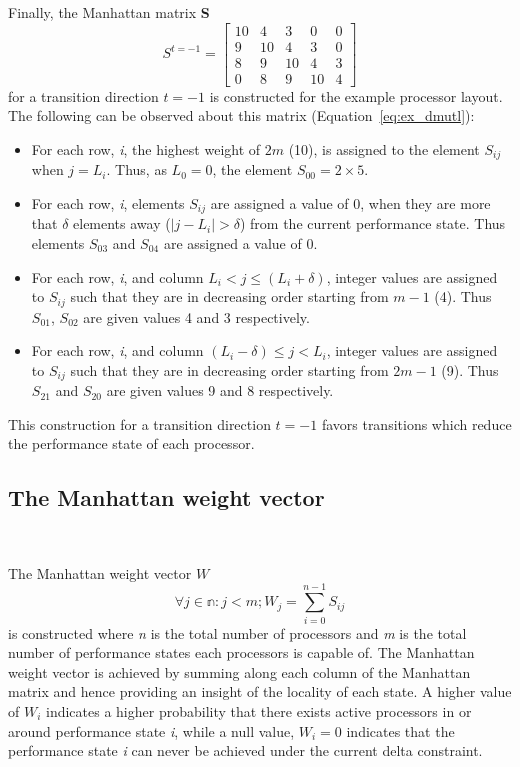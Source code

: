 Finally, the Manhattan matrix \textbf{S}
\begin{equation}
    S^{t = -1} = \left[
     \begin{array}{ccccc}
       10 & 4 & 3 & 0 & 0 \\
       9 & 10 & 4 & 3 & 0 \\
       8 & 9 & 10 & 4 & 3 \\
       0 & 8 & 9 & 10 & 4
     \end{array}
   \right]
\label{eq:ex_dmutl}
\end{equation}
for a transition direction $t = -1$ is constructed for the example processor layout. 
The following can be observed about this matrix (Equation~\eqref{eq:ex_dmutl}):
\begin{itemize}
\item For each row, \textit{i}, the highest weight of $2m$ (10), is assigned to the 
element $S_{ij}$ when $j = L_i$. Thus, as $L_0 = 0$, the element $S_{00} = 2 \times 5$.
\item For each row, \textit{i}, elements $S_{ij}$ are assigned a value of 0, 
when they are more that $\delta$ elements away ($|j - L_i| > \delta$) from the current performance state. 
Thus elements $S_{03}$ and $S_{04}$ are assigned a value of 0.
\item For each row, \textit{i}, and column $L_i < j \leq (L_i + \delta)$, integer values are assigned 
to $S_{ij}$ such that they are in decreasing order starting from $m-1$ (4).
Thus $S_{01}$, $S_{02}$ are given values 4 and 3 respectively. 
\item For each row, \textit{i}, and column $(L_i - \delta) \leq j < L_i$, integer values are assigned 
to $S_{ij}$ such that they are in decreasing order starting from $2m-1$ (9).
Thus $S_{21}$ and $S_{20}$ are given values 9 and 8 respectively.
\end{itemize}
This construction for a transition direction $t = -1$ favors transitions which reduce the performance state of each processor. 


\subsection{The Manhattan weight vector}~\label{sec:weight}

The Manhattan weight vector $W$
\begin{equation}
    \forall j \in \mathbb{n} : j < m; W_j = \displaystyle\sum_{i=0}^{n-1} {S_{ij}}
\label{eq:state_weight}
\end{equation}
is constructed where \textit{n} is the total number of processors and \textit{m} is the total number of
performance states each processors is capable of.
The Manhattan weight vector is achieved by summing along each column 
of the Manhattan matrix and hence providing an insight of the locality of each state. A higher value of $W_i$ 
indicates a higher probability that there exists active processors in or around
performance state \textit{i}, while a null value, $W_i = 0$ indicates that the performance state \textit{i}
can never be achieved under the current delta constraint. 


